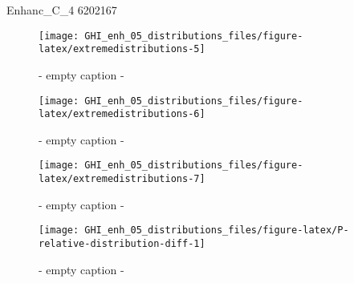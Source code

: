 \documentclass[
  10pt,
  a4paper,oneside]{article}
\begin{document}
Enhanc\_C\_4
6202167

\begin{figure}[H]

{\centering \texttt{[image: GHI\_enh\_05\_distributions\_files/figure-latex/extremedistributions-5]} 

}

\caption{ - empty caption - }\label{fig:extremedistributions-5}
\end{figure}
\begin{figure}[H]

{\centering \texttt{[image: GHI\_enh\_05\_distributions\_files/figure-latex/extremedistributions-6]} 

}

\caption{ - empty caption - }\label{fig:extremedistributions-6}
\end{figure}
\begin{figure}[H]

{\centering \texttt{[image: GHI\_enh\_05\_distributions\_files/figure-latex/extremedistributions-7]} 

}

\caption{ - empty caption - }\label{fig:extremedistributions-7}
\end{figure}
\begin{figure}[H]

{\centering \texttt{[image: GHI\_enh\_05\_distributions\_files/figure-latex/P-relative-distribution-diff-1]} 

}

\caption{ - empty caption - }\label{fig:P-relative-distribution-diff-1}
\end{figure}
\end{document}
